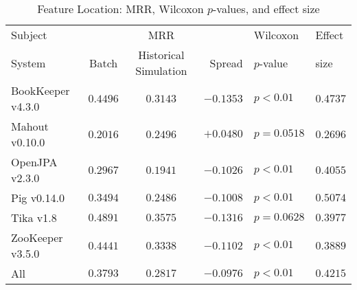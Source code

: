 \begin{table}[t]
\centering
\caption{Feature Location: MRR, Wilcoxon $p$-values, and effect size}
\begin{tabular}{l|ccr|ll}
\toprule
Subject & & MRR & & Wilcoxon & Effect \\
System  &  Batch & Historical Simulation & Spread & $p$-value & size \\
\midrule
BookKeeper v4.3.0 & $\bm{0.4496}$ & $0.3143$ & $-0.1353$ & $p < 0.01$ & $0.4737$ \\
Mahout v0.10.0 & $0.2016$ & $\bm{0.2496}$ & $+0.0480$ & $p = 0.0518$ & $0.2696$ \\
OpenJPA v2.3.0 & $\bm{0.2967}$ & $0.1941$ & $-0.1026$ & $p < 0.01$ & $0.4055$ \\
Pig v0.14.0 & $\bm{0.3494}$ & $0.2486$ & $-0.1008$ & $p < 0.01$ & $0.5074$ \\
Tika v1.8 & $\bm{0.4891}$ & $0.3575$ & $-0.1316$ & $p = 0.0628$ & $0.3977$ \\
ZooKeeper v3.5.0 & $\bm{0.4441}$ & $0.3338$ & $-0.1102$ & $p < 0.01$ & $0.3889$ \\
\midrule
All & $\bm{0.3793}$ & $0.2817$ & $-0.0976$ & $p < 0.01$ & $0.4215$ \\
\bottomrule
\end{tabular}
\label{table:feature_location_rq2}
\end{table}
